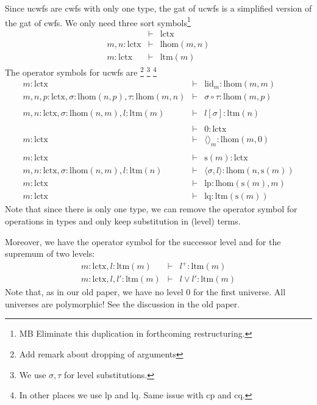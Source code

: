 \documentclass[11pt,a4paper]{article}
\theoremstyle{definition}
\def\lhom{\mathrm{lhom}}
\def\lHom{\mathrm{lhom}}
\def\lctx{\mathrm{lctx}}
\def\lty{\mathrm{level}}
\def\ltm{\mathrm{ltm}}
\def\lp{\mathrm{lp}}
\def\lq{\mathrm{lq}}
\def\s{\mathrm{s}}
\def\lid{\mathrm{lid}}
\def\cp{\mathrm{cp}}
\def\cq{\mathrm{cq}}
\newcommand{\tuple}[1]{\langle #1 \rangle}
\begin{document}
Since ucwfs are cwfs with only one type, the gat of ucwfs is a simplified version of the gat of cwfs. We only need three sort symbols\footnote{%
MB Eliminate this duplication in forthcoming restructuring.} 
\begin{eqnarray*}
&\vdash& \lctx\\
m, n : \lctx &\vdash& \lHom(m,n)\\
m : \lctx &\vdash& \ltm(m)
\end{eqnarray*}
The operator symbols for ucwfs are
\footnote{Add remark about dropping of arguments}
\footnote{We use  $\sigma,\tau$ for level substitutions.}
\footnote{In other places we use $\lp$ and $\lq$. Same issue with $\cp$ and $\cq$.}
\begin{eqnarray*}
m : \lctx &\vdash& \lid_m : \lhom(m,m)\\
m, n, p : \lctx, \sigma : \lhom(n,p), \tau : \lhom(m,n) &\vdash&
\sigma \circ \tau : \lhom(m,p)\\
&&\\
m,n: \lctx, \sigma : \lhom(n,m), l :\ltm(m) &\vdash&  l[\sigma] : \ltm(n)\\
&&\\
&\vdash& 0 : \lctx\\
m : \lctx &\vdash& \tuple{}_m : \lhom(m,0)\\
&&\\
m : \lctx &\vdash& \s(m) : \lctx\\
m,n : \lctx, \sigma : \lhom(n,m), l:\ltm(n) &\vdash& \tuple{\sigma,l} : \lhom(n,\s(m))\\
m : \lctx &\vdash& \lp: \lhom(\s(m),m)\\
m : \lctx &\vdash& \lq: \ltm(\s(m))
\end{eqnarray*}
Note that since there is only one type, we can remove the operator symbol for operations in types and only keep substitution in (level) terms.

Moreover, we have the operator symbol for the successor level and for the supremum of two levels:
\begin{eqnarray*}
m : \lctx, l : \ltm(m) &\vdash& l^+ : \ltm(m)\\
m : \lctx, l,l' : \ltm(m) &\vdash& l \vee l' : \ltm(m)
\end{eqnarray*}
Note that, as in our old paper, we have no level 0 for the first universe. All universes are polymorphic! See the discussion in the old paper.
\end{document}
